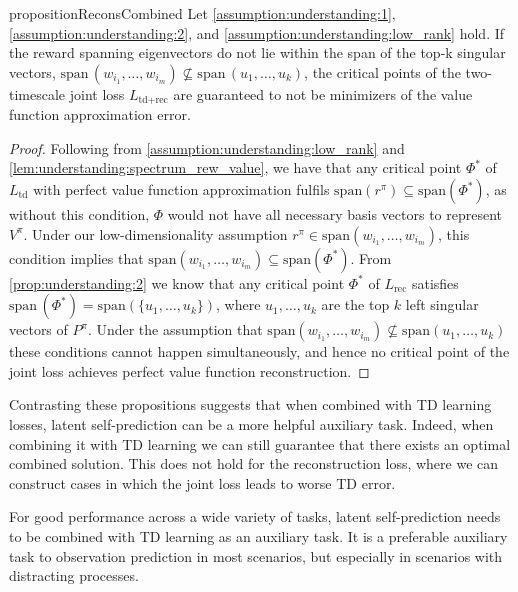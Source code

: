 \begin{restatable}{proposition}{ReconsCombined}
    Let \autoref{assumption:understanding:1}, \autoref{assumption:understanding:2}, and \autoref{assumption:understanding:low_rank} hold. If the reward spanning eigenvectors do not lie within the span of the top-k singular vectors, $\mathrm{span}\,(w_{i_1},\allowbreak \dots,\allowbreak w_{i_m}) \not\subseteq \mathrm{span}\,(u_1,\dots,u_k)$, the critical points of the two-timescale joint loss $L_{\text{td}+\text{rec}}$ are guaranteed to not be minimizers of the value function approximation error. 
\end{restatable}
\begin{proof}
    Following from \autoref{assumption:understanding:low_rank} and \cref{lem:understanding:spectrum_rew_value}, we have that any critical point $\Phi^*$ of $L_\text{td}$ with perfect value function approximation fulfils $\mathrm{span}(r^\pi)\subseteq \mathrm{span}(\Phi^*)$, as without this condition, $\Phi$ would not have all necessary basis vectors to represent $V^\pi$. Under our low-dimensionality assumption $r^\pi \in \mathrm{span}(w_{i_1},\dots,w_{i_m})$, this condition implies that $\mathrm{span}(w_{i_1},\dots,w_{i_m})\subseteq \mathrm{span}(\Phi^*)$. From \cref{prop:understanding:2} we know that any critical point $\Phi^*$ of $L_\text{rec}$ satisfies $\mathrm{span}\,({\Phi^*})=\mathrm{span}\left(\{u_1,\dots,u_k\}\right)$, where $u_1,\dots,u_k$ are the top $k$ left singular vectors of $P^\pi$. Under the assumption that $\mathrm{span}(w_{i_1},\dots,w_{i_m}) \not\subseteq \mathrm{span}(u_1,\dots,u_k)$ these conditions cannot happen simultaneously, and hence no critical point of the joint loss achieves perfect value function reconstruction.
\end{proof}


Contrasting these propositions suggests that when combined with TD learning losses, latent self-prediction can be a more helpful auxiliary task. Indeed, when combining it with TD learning we can still guarantee that there exists an optimal combined solution.
This does not hold for the reconstruction loss, where we can construct cases in which the joint loss leads to worse TD error.

\begin{tcolorbox}[boxrule=0.2mm,colback=white,colframe=uoftblue,boxsep=0pt,top=3pt,bottom=5pt]
\begin{insight} 
For good performance across a wide variety of tasks, latent self-prediction needs to be combined with TD learning as an auxiliary task. It is a preferable auxiliary task to observation prediction in most scenarios, but especially in scenarios with distracting processes.
\label{insight:understanding:3}
\end{insight}
\end{tcolorbox}


